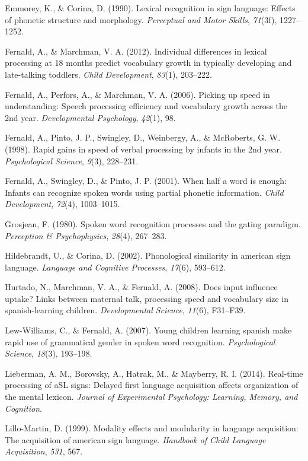 \documentclass[12pt,]{article}
\begin{document}
Emmorey, K., \& Corina, D. (1990). Lexical recognition in sign language:
Effects of phonetic structure and morphology. \emph{Perceptual and Motor
Skills}, \emph{71}(3f), 1227--1252.

Fernald, A., \& Marchman, V. A. (2012). Individual differences in
lexical processing at 18 months predict vocabulary growth in typically
developing and late-talking toddlers. \emph{Child Development},
\emph{83}(1), 203--222.

Fernald, A., Perfors, A., \& Marchman, V. A. (2006). Picking up speed in
understanding: Speech processing efficiency and vocabulary growth across
the 2nd year. \emph{Developmental Psychology}, \emph{42}(1), 98.

Fernald, A., Pinto, J. P., Swingley, D., Weinbergy, A., \& McRoberts, G.
W. (1998). Rapid gains in speed of verbal processing by infants in the
2nd year. \emph{Psychological Science}, \emph{9}(3), 228--231.

Fernald, A., Swingley, D., \& Pinto, J. P. (2001). When half a word is
enough: Infants can recognize spoken words using partial phonetic
information. \emph{Child Development}, \emph{72}(4), 1003--1015.

Grosjean, F. (1980). Spoken word recognition processes and the gating
paradigm. \emph{Perception \& Psychophysics}, \emph{28}(4), 267--283.

Hildebrandt, U., \& Corina, D. (2002). Phonological similarity in
american sign language. \emph{Language and Cognitive Processes},
\emph{17}(6), 593--612.

Hurtado, N., Marchman, V. A., \& Fernald, A. (2008). Does input
influence uptake? Links between maternal talk, processing speed and
vocabulary size in spanish-learning children. \emph{Developmental
Science}, \emph{11}(6), F31--F39.

Lew-Williams, C., \& Fernald, A. (2007). Young children learning spanish
make rapid use of grammatical gender in spoken word recognition.
\emph{Psychological Science}, \emph{18}(3), 193--198.

Lieberman, A. M., Borovsky, A., Hatrak, M., \& Mayberry, R. I. (2014).
Real-time processing of aSL signs: Delayed first language acquisition
affects organization of the mental lexicon. \emph{Journal of
Experimental Psychology: Learning, Memory, and Cognition}.

Lillo-Martin, D. (1999). Modality effects and modularity in language
acquisition: The acquisition of american sign language. \emph{Handbook
of Child Language Acquisition}, \emph{531}, 567.
\end{document}
